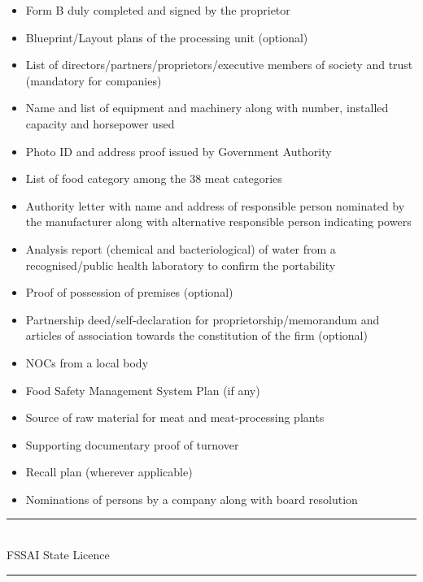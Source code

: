 \documentclass[a4paper, 12pt]{article}
\begin{document}
\begin{itemize}[noitemsep]
\item Form B duly completed and signed by the proprietor 
\item Blueprint/Layout plans of the processing unit (optional) 
\item List of directors/partners/proprietors/executive members of society and trust (mandatory for companies) 
\item Name and list of equipment and machinery along with number, installed capacity and horsepower used 
\item Photo ID and address proof issued by Government Authority 
\item List of food category among the 38 meat categories 
\item Authority letter with name and address of responsible person nominated by the manufacturer along with alternative responsible person indicating powers 
\item Analysis report (chemical and bacteriological) of water from a recognised/public health laboratory to confirm the portability 
\item Proof of possession of premises (optional) 
\item Partnership deed/self-declaration for proprietorship/memorandum and articles of association towards the constitution of the firm (optional) 
\item NOCs from a local body 
\item Food Safety Management System Plan (if any) 
\item Source of raw material for meat and meat-processing plants 
\item Supporting documentary proof of turnover 
\item Recall plan (wherever applicable) 
\item Nominations of persons by a company along with board resolution 
\end{itemize}
\noindent\rule{16cm}{0.4pt}\\
FSSAI State Licence\\
\noindent\rule{16cm}{0.4pt}
\end{document}

